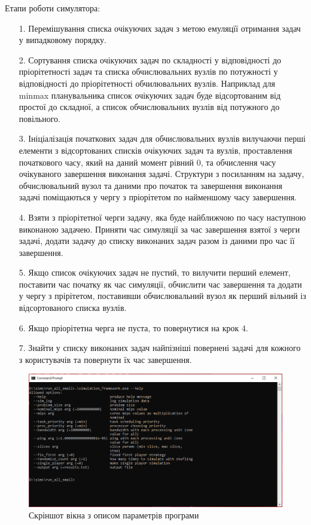 Етапи роботи симулятора:
\begin{itemize}
	\item[1.] Перемішування списка очікуючих задач з метою емуляцїї отримання задач у випадковому порядку.
	
	\item[2.] Сортування списка очікуючих задач по складності у відповідності до пріорітетності задач та списка обчислювальних вузлів по потужності у відповідності до пріорітетності обчилювальних вузлів. Наприклад для minmax планувальника список очікуючих задач буде відсортованим від простої до складної, а список обчислювальних вузлів від потужного до повільного.
	
	\item[3.] Ініціалізація початкових задач для обчислювальних вузлів вилучаючи перші елементи з  відсортованих списків очікуючих задач та вузлів, проставлення початкового часу, який на даний момент рівний 0, та обчислення часу очікуваного завершення виконання задачі. Структури з посиланням на задачу, обчислювальний вузол та даними про початок та завершення виконання задачі поміщаються у чергу з пріорітетом по найменшому часу завершення.
	
	\item[4.] Взяти з пріорітетної черги задачу, яка буде найближчою по часу наступною виконаною задачею. Приняти час симуляції за час завершення взятої з черги задачі, додати задачу до списку виконаних задач разом із даними про час її завершення.
	
	\item[5.] Якщо список очікуючих задач не пустий, то вилучити перший елемент, поставити час початку як час симуляції, обчислити час завершення та додати у чергу з прірітетом, поставивши обчислювальний вузол як перший вільний із відсортованого списка вузлів.
	
	\item[6.] Якщо пріорітетна черга не пуста, то повернутися на крок 4.
	
	\item[7.] Знайти у списку виконаних задач найпізніші повернені задачі для кожного з користувачів та повернути їх час завершення.
\end{itemize}

\begin{figure}[H]
	\centering
	\includegraphics[width=\textwidth]{practice/img/help_ilustration}
	\caption{Скріншот вікна з описом параметрів програми}
	\label{fig:help_ilustration}
\end{figure}

